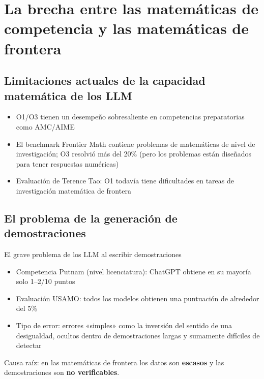 \section{La brecha entre las matemáticas de competencia y las matemáticas de frontera}

\subsection{Limitaciones actuales de la capacidad matemática de los LLM}

\begin{itemize}
    \item O1/O3 tienen un desempeño sobresaliente en competencias preparatorias como AMC/AIME
    \item El benchmark Frontier Math contiene problemas de matemáticas de nivel de investigación; O3 resolvió más del 20\% (pero los problemas están diseñados para tener respuestas numéricas)
    \item Evaluación de Terence Tao: O1 todavía tiene dificultades en tareas de investigación matemática de frontera
\end{itemize}

\subsection{El problema de la generación de demostraciones}

\begin{warningbox}{El grave problema de los LLM al escribir demostraciones}
\begin{itemize}
    \item Competencia Putnam (nivel licenciatura): ChatGPT obtiene en su mayoría solo 1--2/10 puntos
    \item Evaluación USAMO: todos los modelos obtienen una puntuación de alrededor del 5\%
    \item Tipo de error: errores «simples» como la inversión del sentido de una desigualdad, ocultos dentro de demostraciones largas y sumamente difíciles de detectar
\end{itemize}
Causa raíz: en las matemáticas de frontera los datos son \textbf{escasos} y las demostraciones son \textbf{no verificables}.
\end{warningbox}

